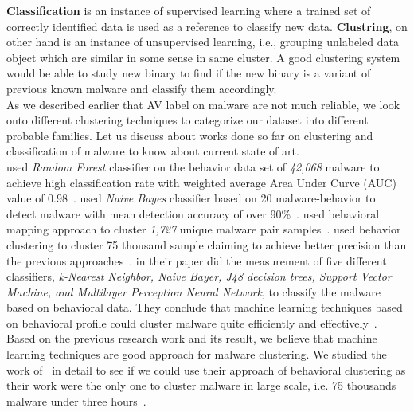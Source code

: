 \textbf{Classification} is an instance of supervised learning where a trained set of correctly identified data is used as a reference to classify new data.
\textbf{Clustring}, on other hand is an instance of unsupervised learning, i.e., grouping unlabeled data object which are similar in some sense in same cluster.
A good clustering system would be able to study new binary to find if the new binary is a variant of previous known malware and classify them accordingly.\\
As we described earlier that AV label on malware are not much reliable, we look onto different clustering techniques to categorize our dataset into different probable families.
Let us discuss about works done so far on clustering and classification of malware to know about current state of art.\\
\textbf{\citeauthor{pirscoveanu}} used \emph{Random Forest} classifier on the behavior data set of \emph{42,068} malware to achieve high classification rate with weighted average Area Under Curve (AUC) value of 0.98~\cite[]{pirscoveanu}.
\textbf{\citeauthor{mosko}} used \emph{Naive Bayes} classifier based on 20 malware-behavior to detect malware with mean detection accuracy of over 90\%~\cite[]{mosko}.
\textbf{\citeauthor{yavvari}} used behavioral mapping approach to cluster \emph{1,727} unique malware pair samples~\cite[]{yavvari}.
\textbf{\citeauthor{bayer}} used behavior clustering to cluster 75 thousand sample claiming to achieve better precision than the previous approaches~\cite[]{bayer}.
\textbf{\citeauthor{firdausi}} in their paper did the measurement of five different classifiers, \emph{k-Nearest Neighbor, Naive Bayer, J48 decision trees, Support Vector Machine, and Multilayer Perception Neural Network}, to classify the malware based on behavioral data.
They conclude that machine learning techniques based on behavioral profile could cluster malware quite efficiently and effectively~\cite[]{firdausi}.\\
Based on the previous research work and its result, we believe that machine learning techniques are good approach for malware clustering.
We studied the work of~\citeauthor{bayer} in detail to see if we could use their approach of behavioral clustering as their work were the only one to cluster malware in large scale, i.e. 75 thousands malware under three hours~\cite[]{bayer}.
